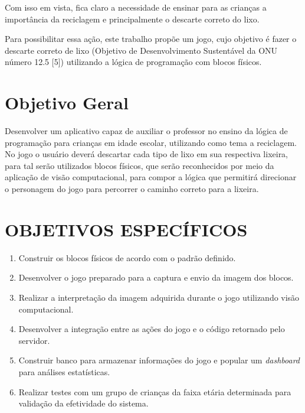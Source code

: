 Com isso em vista, fica claro a necessidade de ensinar para as crianças a importância da reciclagem e principalmente o descarte correto do lixo.

Para possibilitar essa ação, este trabalho propõe um jogo, cujo objetivo é fazer o descarte correto de lixo (Objetivo de Desenvolvimento Sustentável da ONU número 12.5 [5]) utilizando a lógica de programação com blocos físicos.

\section{Objetivo Geral}


Desenvolver um aplicativo capaz de auxiliar o professor no ensino da lógica de programação para crianças em idade escolar, utilizando como tema a reciclagem. No jogo o usuário deverá descartar cada tipo de lixo em sua respectiva lixeira, para tal serão utilizados blocos físicos, que serão reconhecidos por meio da aplicação de visão computacional, para compor a lógica que permitirá direcionar o personagem do jogo para percorrer o caminho correto para a lixeira.

\section{OBJETIVOS ESPECÍFICOS}

\begin{enumerate}
\item Construir os blocos físicos de acordo com o padrão definido.
\item Desenvolver o jogo preparado para a captura e envio da imagem dos blocos.
\item Realizar a interpretação da imagem adquirida durante o jogo utilizando visão computacional.
\item Desenvolver a integração entre as ações do jogo e o código retornado pelo servidor.
\item Construir banco para armazenar informações do jogo e popular um \textit{dashboard} para análises estatísticas.
\item Realizar testes com um grupo de crianças da faixa etária determinada para validação da efetividade do sistema.
\end{enumerate}


